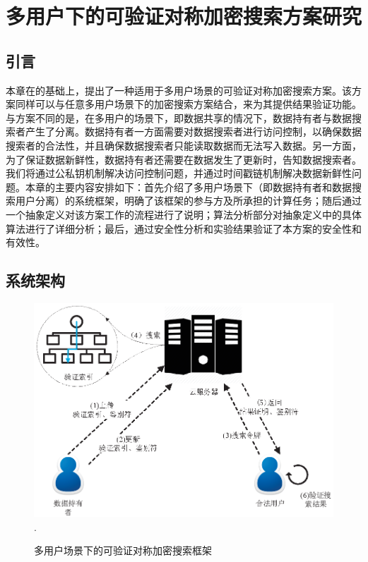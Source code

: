 \chapter{多用户下的可验证对称加密搜索方案研究}
\label{cha:multi-user}
\section{引言}
本章在\single 的基础上，提出了一种适用于多用户场景的可验证对称加密搜索方案\multi 。该方案同样可以与任意多用户场景下的加密搜索方案结合，来为其提供结果验证功能。与\single 方案不同的是，在多用户的场景下，即数据共享的情况下，数据持有者与数据搜索者产生了分离。数据持有者一方面需要对数据搜索者进行访问控制，以确保数据搜索者的合法性，并且确保数据搜索者只能读取数据而无法写入数据。另一方面，为了保证数据新鲜性，数据持有者还需要在数据发生了更新时，告知数据搜索者。我们将通过公私钥机制解决访问控制问题，并通过时间戳链机制解决数据新鲜性问题。本章的主要内容安排如下：首先介绍了多用户场景下（即数据持有者和数据搜索用户分离）的系统框架，明确了该框架的参与方及所承担的计算任务；随后通过一个抽象定义对该方案工作的流程进行了说明；算法分析部分对抽象定义中的具体算法进行了详细分析；最后，通过安全性分析和实验结果验证了本方案的安全性和有效性。



\section{系统架构}

\begin{figure}[t]
\centering
\includegraphics[width=5 in]{fig/GM-VSSE}
\DeclareGraphicsExtensions.
\caption{多用户场景下的可验证对称加密搜索框架\multi}
\label{fig:GM-VSSE}
\end{figure}

